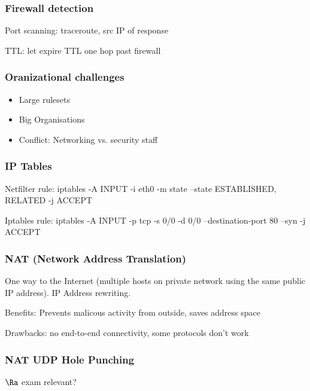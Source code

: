 \documentclass[fs, footer]{latex4ei}
\begin{document}
\begin{multicols*}{4}
{ \subsubsection{Firewall detection}

 Port scanning: traceroute, src IP of response

 TTL:  let expire TTL one hop past firewall

 \subsubsection{Oranizational challenges}
 \begin{itemize}
  	\item Large rulesets
  	\item Big Organisations
  	\item Conflict: Networking vs. security staff
  \end{itemize}

  \subsubsection{IP Tables}
	Netfilter rule:
	iptables -A INPUT -i eth0 -m state --state ESTABLISHED, RELATED -j ACCEPT

	Iptables rule:  iptables -A INPUT -p tcp -s 0/0 -d 0/0 --destination-port 80 --syn -j ACCEPT

	\subsubsection{NAT (Network Address Translation)}
	One way to the Internet (multiple hosts on private network using the same public IP address). IP Address rewriting.

	Benefits: Prevents malicous activity from outside, saves address space

	Drawbacks: no end-to-end connectivity, some protocols don't work

	\subsubsection{NAT UDP Hole Punching}

	$\Ra$ exam relevant?
}
\end{multicols*}
\end{document}
